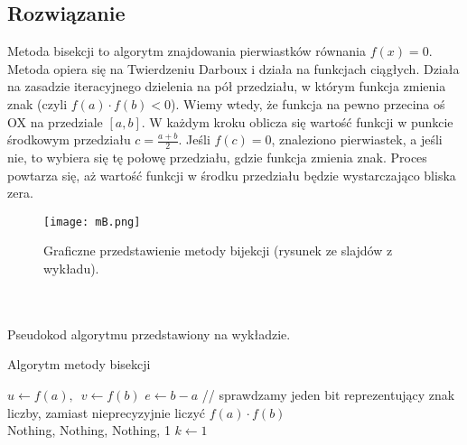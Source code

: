 \documentclass{article}
\begin{document}
\subsection{Rozwiązanie}
Metoda bisekcji to algorytm znajdowania pierwiastków równania $f(x)=0$. Metoda opiera się na Twierdzeniu Darboux i działa na funkcjach ciągłych. Działa na zasadzie iteracyjnego dzielenia na pół przedziału, w którym funkcja zmienia znak (czyli $f(a)⋅f(b)<0$). Wiemy wtedy, że funkcja na pewno przecina oś OX na przedziale $[a, b]$. W każdym kroku oblicza się wartość funkcji w punkcie środkowym przedziału $c=\frac{a+b}{2}$. Jeśli $f(c)=0$, znaleziono pierwiastek, a jeśli nie, to wybiera się tę połowę przedziału, gdzie funkcja zmienia znak. Proces powtarza się, aż wartość funkcji w środku przedziału będzie wystarczająco bliska zera.
\begin{figure}[H]
    \centering
    \begin{minipage}{0.6\textwidth}
    \texttt{[image: mB.png]}
    \caption{Graficzne przedstawienie metody bijekcji (rysunek ze slajdów z wykładu).}
    \end{minipage}
\end{figure}
\\ \\ 
Pseudokod algorytmu przedstawiony na wykładzie. \\
\begin{algorithm}[H]
\caption{Algorytm metody bisekcji}
$u \gets f(a),$\ $v \gets f(b)$\;
$e \gets b - a$\;
// sprawdzamy jeden bit reprezentujący znak liczby, zamiast nieprecyzyjnie liczyć $f(a) \cdot f(b)$               
\\  { 
    \Return Nothing, Nothing, Nothing, 1\;
}
$k \gets 1$\;
\
\end{algorithm}
\end{document}
